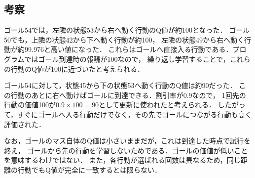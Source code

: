 \documentclass[a4paper,11pt]{ltjsarticle}
\begin{document}
\subsection*{考察}
ゴール54では，左隣の状態53から右へ動く行動のQ値が約100となった．
ゴール50でも，上隣の状態42から下へ動く行動が約100，
左隣の状態49から右へ動く行動が約99.976と高い値になった．
これらはゴールへ直接入る行動である．プログラムではゴール到達時の報酬が100なので，
繰り返し学習することで，これらの行動のQ値が100に近づいたと考えられる．

ゴール54に対して，状態45から下の状態53へ動く行動のQ値は約90だった．
この行動のあとに右へ動けばゴールに到達できる．割引率が0.9なので，
1回先の行動の価値100が$0.9\times100=90$として更新に使われたと考えられる．
したがって，すぐにゴールへ入る行動だけでなく，その先でゴールにつながる行動も高く評価された．

なお，ゴールのマス自体のQ値は小さいままだが，これは到達した時点で試行を終え，
ゴールから先の行動を学習しないためである．ゴールの価値が低いことを意味するわけではない．
また，各行動が選ばれる回数は異なるため，同じ距離の行動でもQ値が完全に一致するとは限らない．
\end{document}
